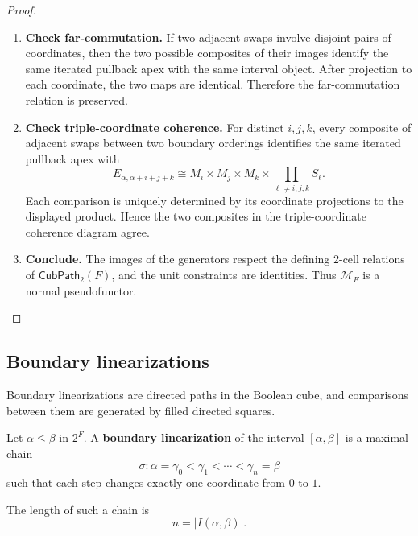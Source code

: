 \begin{proof}
\begin{enumerate}
        \item \textbf{Check far-commutation.}
        If two adjacent swaps involve disjoint pairs of coordinates, then the
        two possible composites of their images identify the same iterated
        pullback apex with the same interval object. After projection to each
        coordinate, the two maps are identical. Therefore the
        far-commutation relation is preserved.

        \item \textbf{Check triple-coordinate coherence.}
        For distinct \(i,j,k\), every composite of adjacent swaps between two
        boundary orderings identifies the same iterated pullback apex with
        \[
            E_{\alpha,\alpha+i+j+k}
            \cong
            M_i\times M_j\times M_k
            \times
            \prod_{\ell\neq i,j,k}S_\ell.
        \]
        Each comparison is uniquely determined by its coordinate projections
        to the displayed product. Hence the two composites in the
        triple-coordinate coherence diagram agree.

        \item \textbf{Conclude.}
        The images of the generators respect the defining 2-cell relations of
        \(\mathsf{CubPath}_2(F)\), and the unit constraints are identities.
        Thus \(\mathcal M_F\) is a normal pseudofunctor.
    \end{enumerate}
\end{proof}

\subsection{Boundary linearizations}
\label{subsec:cmett-boundary-linearizations}

Boundary linearizations are directed paths in the Boolean cube, and
comparisons between them are generated by filled directed squares.

\begin{definition}
\label{def:cmett-boundary-linearization}
    Let \(\alpha\leq\beta\) in \(2^F\). A \textbf{boundary linearization} of
    the interval \([\alpha,\beta]\) is a maximal chain
    \[
        \sigma:
        \alpha=\gamma_0<\gamma_1<\cdots<\gamma_n=\beta
    \]
    such that each step changes exactly one coordinate from \(0\) to \(1\).
\end{definition}

The length of such a chain is
\[
    n=|I(\alpha,\beta)|.
\]

